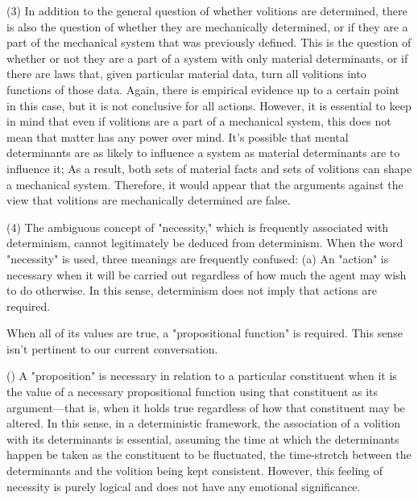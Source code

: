 \documentclass[a4paper,12pt]{book}[2004/02/16]
\theoremstyle{ilemma}
\theoremstyle{itheorem}
\theoremstyle{iother}
\theoremstyle{icorollary}
\theoremstyle{numcorollary}
\theoremstyle{idefinition}
\begin{document}
(3) In addition to the general question of whether volitions are determined, there is also the question of whether they are mechanically determined, or if they are a part of the mechanical system that was previously defined. This is the question of whether or not they are a part of a system with only material determinants, or if there are laws that, given particular material data, turn all volitions into functions of those data. Again, there is empirical evidence up to a certain point in this case, but it is not conclusive for all actions. However, it is essential to keep in mind that even if volitions are a part of a mechanical system, this does not mean that matter has any power over mind. It's possible that mental determinants are as likely to influence a system as material determinants are to influence it; As a result, both sets of material facts and sets of volitions can shape a mechanical system. Therefore, it would appear that the arguments against the view that volitions are mechanically determined are false.

(4) The ambiguous concept of "necessity," which is frequently associated with determinism, cannot legitimately be deduced from determinism. When the word "necessity" is used, three meanings are frequently confused: (a) An "action" is necessary when it will be carried out regardless of how much the agent may wish to do otherwise. In this sense, determinism does not imply that actions are required.

When all of its values are true, a "propositional function" is required. This sense isn't pertinent to our current conversation.

() A "proposition" is necessary in relation to a particular constituent when it is the value of a necessary propositional function using that constituent as its argument—that is, when it holds true regardless of how that constituent may be altered. In this sense, in a
deterministic framework, the association of a volition with its
determinants is essential, assuming the time at which the determinants happen
be taken as the constituent to be fluctuated, the time-stretch between
the determinants and the volition being kept consistent. However, this feeling of necessity is purely logical and does not have any emotional significance.
\end{document}
